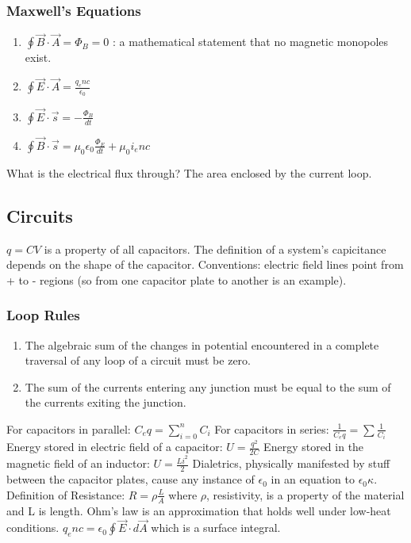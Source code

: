 \documentclass{article}
\begin{document}
        \subsubsection*{Maxwell's Equations}
        \begin{enumerate}[leftmargin=\lindent]
            \item $\oint \vec{B} \cdot \vec{A} = \Phi_B = 0$ : a mathematical statement that no magnetic monopoles exist.
            \item $\oint \vec{E} \cdot \vec{A} = \frac{q_enc}{\epsilon_0}$
            \item $\oint \vec{E} \cdot \vec{s} = - \frac{\Phi_B}{dt}$
            \item $\oint \vec{B} \cdot \vec{s} = \mu_0\epsilon_0 \frac{\Phi_E}{dt} + \mu_0 i_enc$
        \end{enumerate}
        What is the electrical flux through? The area enclosed by the current loop.
        
    \subsection*{Circuits}
        $q = C V$ is a property of all capacitors. The definition of a system's capicitance
        depends on the shape of the capacitor.
        Conventions: electric field lines point from + to - regions (so from one capacitor plate to another is
        an example).
        \subsubsection*{Loop Rules}
        \begin{enumerate}
            \item The algebraic sum of the changes in potential encountered in a complete traversal
            of any loop of a circuit must be zero.
            \item The sum of the currents entering any junction must be equal to the sum of the currents
            exiting the junction.
        \end{enumerate}
        For capacitors in parallel: $ C_eq = \sum\limits_{i=0}^{n} C_i$
        For capacitors in series: $ \frac{1}{C_eq} = \sum \frac{1}{C_i}$
        Energy stored in electric field of a capacitor: $ U = \frac{q^2}{2C}$
        Energy stored in the magnetic field of an inductor: $U = \frac{L i^2}{2}$
        Dialetrics, physically manifested by stuff between the capacitor plates, cause any instance of $\epsilon_0$ in an equation
        to $ \epsilon_0 \kappa $.
        Definition of Resistance: $ R = \rho \frac{L}{A}$ where $\rho$, resistivity, is a property of the material and L is length.
        Ohm's law is an approximation that holds well under low-heat conditions.
        $q_enc = \epsilon_0 \oint \vec{E} \cdot d\vec{A} $ which is a surface integral.
\end{document}

